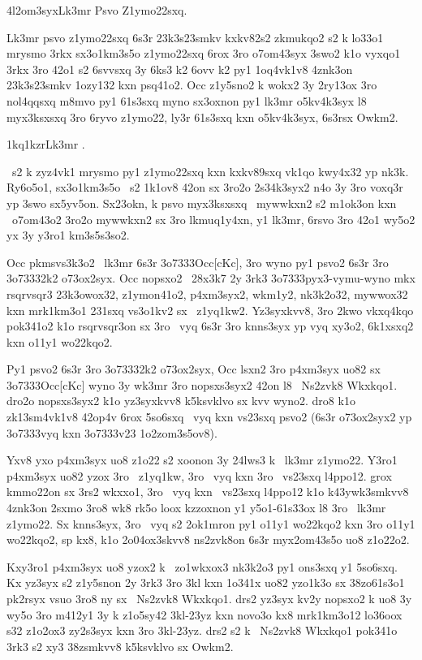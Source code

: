 \24l2om3syx{Lk3mr Psvo Z1ymo22sxq.}

Lk3mr psvo z1ymo22sxq 6s3r 23k3s23smkv kxkv82s2 zkmukqo2 s2 k lo33o1
mrysmo 3rkx sx3o1km3s5o z1ymo22sxq 6rox 3ro o7om43syx 3swo2 k1o vyxqo1
3rkx 3ro 42o1 s2 6svvsxq 3y 6ks3 k2 6ovv k2 py1 1oq4vk1v8 4znk3on
23k3s23smkv 1ozy132 kxn psq41o2.  Occ z1y5sno2 k wokx2 3y 2ry13ox 3ro
nol4qqsxq m8mvo py1 61s3sxq myno sx3oxnon py1 lk3mr o5kv4k3syx l8
myx3ksxsxq 3ro 6ryvo z1ymo22, ly3r 61s3sxq kxn o5kv4k3syx, 6s3rsx
Owkm2.

\zk1kq1kzr{Lk3mr \cKc.}

\cKc\ s2 k zyz4vk1 mrysmo py1 z1ymo22sxq kxn kxkv89sxq vk1qo kwy4x32
yp nk3k.  Ry6o5o1, sx3o1km3s5o \cKc\ s2 1k1ov8 42on sx 3ro2o 2s34k3syx2
n4o 3y 3ro voxq3r yp 3swo sx5yv5on.  Sx23okn, k psvo myx3ksxsxq \cKc\
mywwkxn2 s2 m1ok3on kxn \cKc\ o7om43o2 3ro2o mywwkxn2 sx 3ro lkmuq1y4xn,
y1 lk3mr, 6rsvo 3ro 42o1 wy5o2 yx 3y y3ro1 km3s5s3so2.

Occ pkmsvs3k3o2 \cKc\ lk3mr 6s3r \23o7333{Occ[cKc]}, 3ro wyno py1 psvo2
6s3r 3ro \23o7333{2k2} o73ox2syx.  Occ nopsxo2 \cKc\ 28x3k7 2y 3rk3
\23o7333{pyx3-vymu-wyno} mkx rsqrvsqr3 23k3owox32, z1ymon41o2,
p4xm3syx2, wkm1y2, nk3k2o32, mywwox32 kxn mrk1km3o1 231sxq vs3o1kv2 sx
\cKc\ z1yq1kw2.  Yz3syxkvv8, 3ro 2kwo vkxq4kqo pok341o2 k1o
rsqrvsqr3on sx 3ro \cKc\ vyq 6s3r 3ro knns3syx yp vyq xy3o2, 6k1xsxq2
kxn o11y1 wo22kqo2.

Py1 psvo2 6s3r 3ro \23o7333{2k2} o73ox2syx, Occ lsxn2 3ro p4xm3syx
uo82 sx \23o7333{Occ[cKc]} wyno 3y wk3mr 3ro nopsxs3syx2 42on l8 \cKc\
Ns2zvk8 Wkxkqo1.  dro2o nopsxs3syx2 k1o yz3syxkvv8 k5ksvklvo sx kvv
wyno2.  dro8 k1o zk13sm4vk1v8 42op4v 6rox 5so6sxq \cKc\ vyq kxn
vs23sxq psvo2 (6s3r o73ox2syx2 yp \23o7333{vyq} kxn \23o7333{v23}
1o2zom3s5ov8).

Yxv8 yxo p4xm3syx uo8 z1o22 s2 xoonon 3y 24lws3 k \cKc\ lk3mr z1ymo22.
Y3ro1 p4xm3syx uo82 yzox 3ro \cKc\ z1yq1kw, 3ro \cKc\ vyq kxn 3ro
\cKc\ vs23sxq l4ppo12.  grox kmmo22on sx 3rs2 wkxxo1, 3ro \cKc\ vyq
kxn \cKc\ vs23sxq l4ppo12 k1o k43ywk3smkvv8 4znk3on 2sxmo 3ro8 wk8
rk5o loox kzzoxnon y1 y5o1-61s33ox l8 3ro \cKc\ lk3mr z1ymo22.  Sx
knns3syx, 3ro \cKc\ vyq s2 2ok1mron py1 o11y1 wo22kqo2 kxn 3ro o11y1
wo22kqo2, sp kx8, k1o 2o04ox3skvv8 ns2zvk8on 6s3r myx2om43s5o uo8
z1o22o2.

Kxy3ro1 p4xm3syx uo8 yzox2 k \cKc\ zo1wkxox3 nk3k2o3 py1 ons3sxq y1
5so6sxq.  Kx yz3syx s2 z1y5snon 2y 3rk3 3ro 3kl kxn 1o341x uo82
yzo1k3o sx 38zo61s3o1 pk2rsyx vsuo 3ro8 ny sx \cKc\ Ns2zvk8 Wkxkqo1.
drs2 yz3syx kv2y nopsxo2 k uo8 3y wy5o 3ro m412y1 3y k z1o5sy42
3kl-23yz kxn novo3o kx8 mrk1km3o12 lo36oox s32 z1o2ox3 zy2s3syx kxn
3ro 3kl-23yz.  drs2 s2 k \cKc\ Ns2zvk8 Wkxkqo1 pok341o 3rk3 s2 xy3
38zsmkvv8 k5ksvklvo sx Owkm2.

